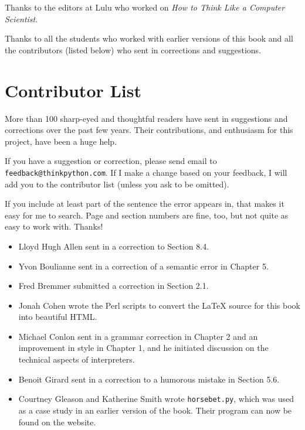 \documentclass[10pt]{book}
\begin{document}
\begin{CJK}{UTF8}{gbsn}
Thanks to the editors at Lulu who worked on
{\em How to Think Like a Computer Scientist}.

Thanks to all the students who worked with earlier
versions of this book and all the contributors (listed
below) who sent in corrections and suggestions.


\section*{Contributor List}

More than 100 sharp-eyed and thoughtful readers have sent in
suggestions and corrections over the past few years.  Their
contributions, and enthusiasm for this project, have been a
huge help.

If you have a suggestion or correction, please send email to 
{\tt feedback@thinkpython.com}.  If I make a change based on your
feedback, I will add you to the contributor list
(unless you ask to be omitted).

If you include at least part of the sentence the
error appears in, that makes it easy for me to search.  Page and
section numbers are fine, too, but not quite as easy to work with.
Thanks!

\begin{itemize}

\small
\item Lloyd Hugh Allen sent in a correction to Section 8.4.

\item Yvon Boulianne sent in a correction of a semantic error in
Chapter 5.

\item Fred Bremmer submitted a correction in Section 2.1.

\item Jonah Cohen wrote the Perl scripts to convert the
LaTeX source for this book into beautiful HTML.

\item Michael Conlon sent in a grammar correction in Chapter 2
and an improvement in style in Chapter 1, and he initiated discussion
on the technical aspects of interpreters.

\item Benoit Girard sent in a
correction to a humorous mistake in Section 5.6.

\item Courtney Gleason and Katherine Smith wrote {\tt horsebet.py},
which was used as a case study in an earlier version of the book.  Their
program can now be found on the website.


\end{itemize}
\end{CJK}
\end{document}
